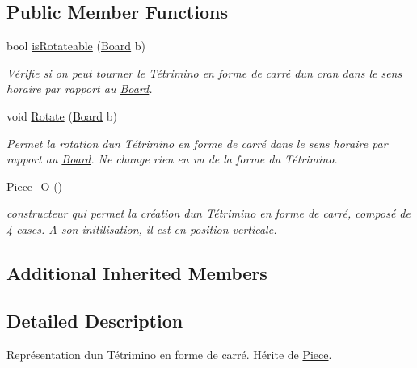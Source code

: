\subsection*{Public Member Functions}
\begin{DoxyCompactItemize}
\item 
bool \hyperlink{classPiece__O_af82900ecec4e7bd058d43825293d8bff}{is\+Rotateable} (\hyperlink{classBoard}{Board} b)
\begin{DoxyCompactList}\small\item\em Vérifie si on peut tourner le Tétrimino en forme de carré d\textquotesingle{}un cran dans le sens horaire par rapport au \hyperlink{classBoard}{Board}. \end{DoxyCompactList}\item 
void \hyperlink{classPiece__O_a69812f938582f176cd4cca997cbb87c1}{Rotate} (\hyperlink{classBoard}{Board} b)
\begin{DoxyCompactList}\small\item\em Permet la rotation d\textquotesingle{}un Tétrimino en forme de carré dans le sens horaire par rapport au \hyperlink{classBoard}{Board}. Ne change rien en vu de la forme du Tétrimino. \end{DoxyCompactList}\item 
\mbox{\label{classPiece__O_aa6abd4c92e4ca830993585f99b7d6a2a}} 
\hyperlink{classPiece__O_aa6abd4c92e4ca830993585f99b7d6a2a}{Piece\+\_\+O} ()
\begin{DoxyCompactList}\small\item\em constructeur qui permet la création d\textquotesingle{}un Tétrimino en forme de carré, composé de 4 cases. A son initilisation, il est en position verticale. \end{DoxyCompactList}\end{DoxyCompactItemize}
\subsection*{Additional Inherited Members}


\subsection{Detailed Description}
Représentation d\textquotesingle{}un Tétrimino en forme de carré. Hérite de \hyperlink{classPiece}{Piece}. 

